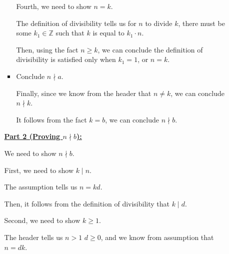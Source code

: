 \documentclass[12pt]{article}
\begin{document}
\begin{enumerate}[a.]
\begin{mdframed}
\begin{enumerate}[1.]
\begin{itemize}
            \bigskip

            \begin{mdframed}
            Fourth, we need to show $n = k$.

            \bigskip

            The definition of divisibility tells us for $n$ to
            divide $k$, there must be some $k_1 \in \mathbb{Z}$ such that
            $k$ is equal to $k_1 \cdot n$.

            \bigskip

            Then, using the fact $n \geq k$, we can conclude the definition of
            divisibility is satisfied only when $k_1 = 1$, or $n = k$.

            \end{mdframed}

            \item Conclude $n \nmid a$.

            \begin{mdframed}
            Finally, since we know from the header that $n \neq k$, we can conclude
            $n \nmid k$.

            \bigskip

            It follows from the fact $k = b$, we can conclude $n \nmid b$.
            \end{mdframed}

        \end{itemize}

        \begin{mdframed}

        \underline{\textbf{Part 2 (Proving $n \nmid b$):}}

        \bigskip

        We need to show $n \nmid b$.

        \bigskip

        First, we need to show $k \mid n$.

        \bigskip

        The assumption tells us $n = kd$.

        \bigskip

        Then, it follows from the definition of divisibility that $k \mid d$.

        \bigskip

        Second, we need to show $k \geq 1$.

        \bigskip

        The header tells us $n > 1$ $d \geq 0$, and we know from
        assumption that $n = dk$.


\end{mdframed}
\end{enumerate}
\end{mdframed}
\end{enumerate}
\end{document}
